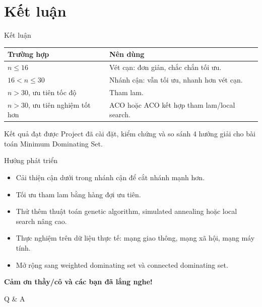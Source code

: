 \documentclass[aspectratio=169, 11pt]{beamer}
\begin{document}
\section{Kết luận}

\begin{frame}{Kết luận}
  \begin{table}
    \centering
    \small
    \begin{tabular}{p{3cm} p{8cm}}
      \toprule
      \textbf{Trường hợp} & \textbf{Nên dùng} \\
      \midrule
      $n \leq 16$ & Vét cạn: đơn giản, chắc chắn tối ưu. \\
      $16 < n \leq 30$ & Nhánh cận: vẫn tối ưu, nhanh hơn vét cạn. \\
      $n > 30$, ưu tiên tốc độ & Tham lam. \\
      $n > 30$, ưu tiên nghiệm tốt hơn & ACO hoặc ACO kết hợp tham lam/local search. \\
      \bottomrule
    \end{tabular}
  \end{table}

  \begin{block}{Kết quả đạt được}
    Project đã cài đặt, kiểm chứng và so sánh 4 hướng giải cho bài toán Minimum Dominating Set.
  \end{block}
\end{frame}

\begin{frame}{Hướng phát triển}
  \begin{itemize}
    \item Cải thiện cận dưới trong nhánh cận để cắt nhánh mạnh hơn.
    \item Tối ưu tham lam bằng hàng đợi ưu tiên.
    \item Thử thêm thuật toán genetic algorithm, simulated annealing hoặc local search nâng cao.
    \item Thực nghiệm trên dữ liệu thực tế: mạng giao thông, mạng xã hội, mạng máy tính.
    \item Mở rộng sang weighted dominating set và connected dominating set.
  \end{itemize}
\end{frame}

\begin{frame}
  \centering
  \Huge\textbf{Cảm ơn thầy/cô và các bạn đã lắng nghe!}

  \vspace{0.8cm}
  \Large Q \& A
\end{frame}
\end{document}
